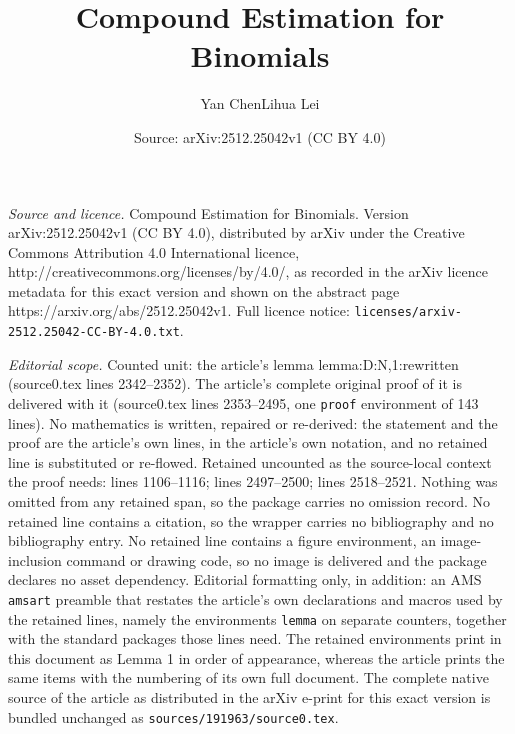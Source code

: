 \documentclass[10pt,a4paper]{amsart}
\title{Compound Estimation for Binomials}
\author{Yan Chen\quad\quad Lihua Lei}
\date{Source: arXiv:2512.25042v1 (CC BY 4.0)}
\begin{document}
\maketitle

\noindent\emph{Source and licence.} Compound Estimation for Binomials. Version arXiv:2512.25042v1 (CC BY 4.0), distributed by arXiv under the Creative Commons Attribution 4.0 International licence, http://creativecommons.org/licenses/by/4.0/, as recorded in the arXiv licence metadata for this exact version and shown on the abstract page https://arxiv.org/abs/2512.25042v1. Full licence notice: \texttt{licenses/arxiv-2512.25042-CC-BY-4.0.txt}.\par\smallskip

\noindent\textit{Editorial scope.} Counted unit: the article's lemma lemma:D:N,1:rewritten (source0.tex lines 2342--2352). The article's complete original proof of it is delivered with it (source0.tex lines 2353--2495, one \texttt{proof} environment of 143 lines). No mathematics is written, repaired or re-derived: the statement and the proof are the article's own lines, in the article's own notation, and no retained line is substituted or re-flowed.  Retained uncounted as the source-local context the proof needs: lines 1106--1116; lines 2497--2500; lines 2518--2521.  Nothing was omitted from any retained span, so the package carries no omission record.  No retained line contains a citation, so the wrapper carries no bibliography and no bibliography entry.  No retained line contains a figure environment, an image-inclusion command or drawing code, so no image is delivered and the package declares no asset dependency.  Editorial formatting only, in addition: an AMS \texttt{amsart} preamble that restates the article's own declarations and macros used by the retained lines, namely the environments \texttt{lemma} on separate counters, together with the standard packages those lines need.  The retained environments print in this document as Lemma 1 in order of appearance, whereas the article prints the same items with the numbering of its own full document.  The complete native source of the article as distributed in the arXiv e-print for this exact version is bundled unchanged as \texttt{sources/191963/source0.tex}.
\end{document}
